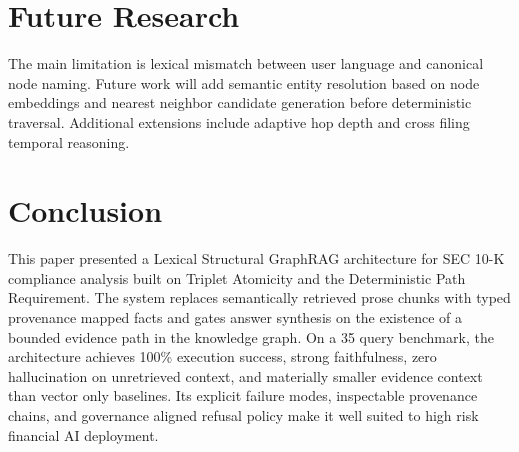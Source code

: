 \documentclass[conference]{IEEEtran}
\begin{document}
\section{Future Research}
The main limitation is lexical mismatch between user language and canonical node naming. Future work will add semantic entity resolution based on node embeddings and nearest neighbor candidate generation before deterministic traversal. Additional extensions include adaptive hop depth and cross filing temporal reasoning.

\section{Conclusion}
This paper presented a Lexical Structural GraphRAG architecture for SEC 10-K compliance analysis built on Triplet Atomicity and the Deterministic Path Requirement. The system replaces semantically retrieved prose chunks with typed provenance mapped facts and gates answer synthesis on the existence of a bounded evidence path in the knowledge graph. On a 35 query benchmark, the architecture achieves 100\% execution success, strong faithfulness, zero hallucination on unretrieved context, and materially smaller evidence context than vector only baselines. Its explicit failure modes, inspectable provenance chains, and governance aligned refusal policy make it well suited to high risk financial AI deployment.
\end{document}

